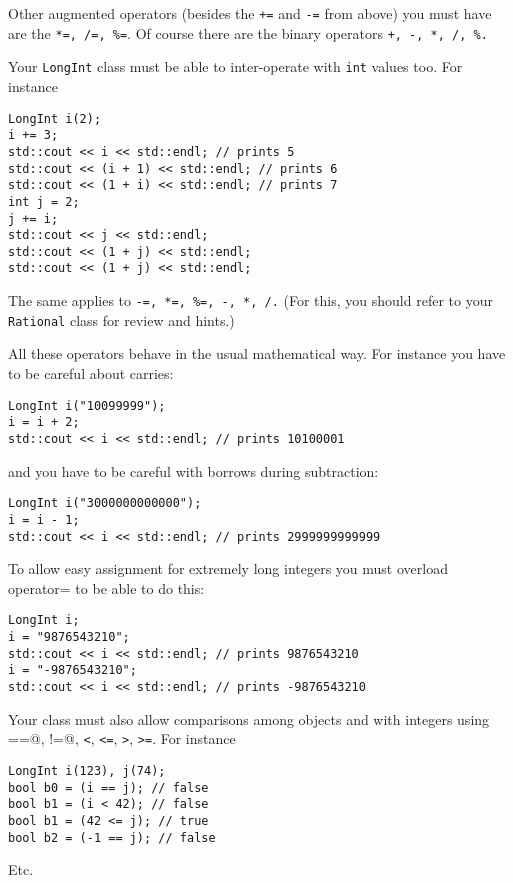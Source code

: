 Other augmented operators (besides the \verb!+=! and \verb!-=! from 
above) you must have are the \verb!*=, /=, %=!. Of course there are 
the binary operators \verb!+, -, *, /, %.!

Your \verb!LongInt! class must be able to inter-operate with \verb!int! 
values too. For instance
\begin{Verbatim}[fontsize=\footnotesize,frame=single]
LongInt i(2);
i += 3;
std::cout << i << std::endl; // prints 5
std::cout << (i + 1) << std::endl; // prints 6
std::cout << (1 + i) << std::endl; // prints 7
int j = 2;
j += i;
std::cout << j << std::endl; 
std::cout << (1 + j) << std::endl; 
std::cout << (1 + j) << std::endl; 
\end{Verbatim}

The same applies to \verb!-=, *=, %=, -, *, /.! (For this, you should 
refer to your \verb!Rational! class for review and hints.) 

All these operators behave in the usual mathematical way. For instance 
you have to be careful about carries:
\begin{Verbatim}[fontsize=\footnotesize,frame=single]
LongInt i("10099999");
i = i + 2;
std::cout << i << std::endl; // prints 10100001
\end{Verbatim}
and you have to be careful with borrows during subtraction:
\begin{Verbatim}[fontsize=\footnotesize,frame=single]
LongInt i("3000000000000");
i = i - 1;
std::cout << i << std::endl; // prints 2999999999999
\end{Verbatim}

To allow easy assignment for extremely long integers you must overload 
operator= to be able to do this:
\begin{Verbatim}[fontsize=\footnotesize,frame=single]
LongInt i;
i = "9876543210";
std::cout << i << std::endl; // prints 9876543210
i = "-9876543210";
std::cout << i << std::endl; // prints -9876543210
\end{Verbatim}

Your class must also allow comparisons among objects and with integers 
using 
\verb@==@,
\verb@!=@,
\verb!<!, \verb!<=!, \verb!>!, \verb!>=!.
For instance
\begin{Verbatim}[fontsize=\footnotesize,frame=single]
LongInt i(123), j(74);
bool b0 = (i == j); // false
bool b1 = (i < 42); // false
bool b1 = (42 <= j); // true    
bool b2 = (-1 == j); // false
\end{Verbatim}

Etc.

